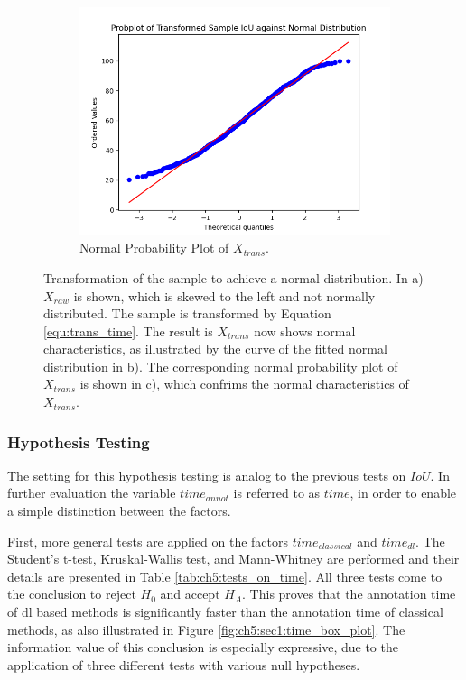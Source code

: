 \begin{figure} [h]
	\begin{subfigure}[t]{0.3\textwidth}
		\centering
		\includegraphics[width=\textwidth]{figures/chap51_time_probplot.png}
		\caption{
			Normal Probability Plot of $X_{trans}$.
		}\label{fig:ch5:sec1:time_probplot}
	\end{subfigure}
	\caption[Time Sample Transformation]{
		Transformation of the sample to achieve a normal distribution.
		In a) $X_{raw}$ is shown, which is skewed to the left and not normally distributed.
		The sample is transformed by Equation \ref{equ:trans_time}.
		The result is $X_{trans}$ now shows normal characteristics, as illustrated by the curve of the fitted normal distribution in b).
		The corresponding normal probability plot of $X_{trans}$ is shown in c), which confrims the normal characteristics of $X_{trans}$.
	}\label{fig:ch5:sec1:time_transformation_iou}
\end{figure}




\subsubsection{Hypothesis Testing}

The setting for this hypothesis testing is analog to the previous tests on $IoU$.
In further evaluation the variable $time_{annot}$ is referred to as $time$, in order to enable a simple distinction between the factors.

First, more general tests are applied on the factors $time_{classical}$ and $time_{dl}$.
The Student's t-test, Kruskal-Wallis test, and Mann-Whitney are performed and their details are presented in Table \ref{tab:ch5:tests_on_time}.
All three tests come to the conclusion to reject $H_{0}$ and accept $H_{A}$.
This proves that the annotation time of \gls{dl} based methods is significantly faster than the annotation time of classical methods, as also illustrated in Figure \ref{fig:ch5:sec1:time_box_plot}.
The information value of this conclusion is especially expressive, due to the application of three different tests with various null hypotheses.

